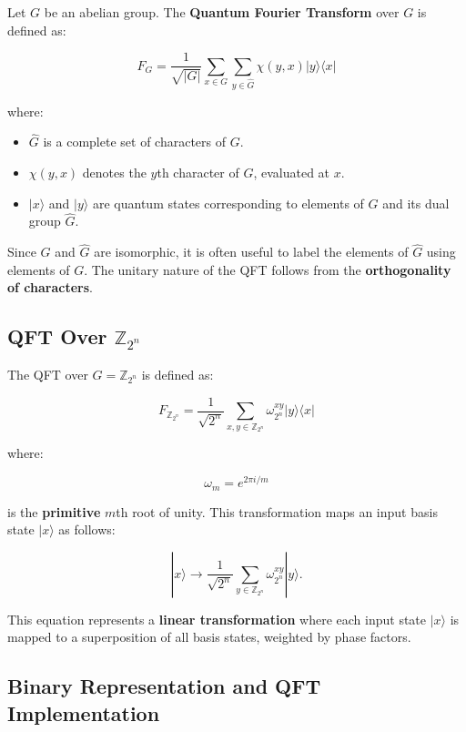 \documentclass[11pt]{article}
\theoremstyle{definition}
\begin{document}
Let \( G \) be an abelian group. The \textbf{Quantum Fourier Transform} over \( G \) is defined as:

\[
F_G = \frac{1}{\sqrt{|G|}} \sum_{x \in G} \sum_{y \in \hat{G}} \chi(y,x) | y \rangle \langle x |
\]

where:

\begin{itemize}
    \item \( \hat{G} \) is a complete set of characters of \( G \).
    \item \( \chi(y,x) \) denotes the \( y \)th character of \( G \), evaluated at \( x \).
    \item \( |x\rangle \) and \( |y\rangle \) are quantum states corresponding to elements of \( G \) and its dual group \( \hat{G} \).
\end{itemize}

Since \( G \) and \( \hat{G} \) are isomorphic, it is often useful to label the elements of \( \hat{G} \) using elements of \( G \). The unitary nature of the QFT follows from the \textbf{orthogonality of characters}.



\subsection{QFT Over \( \mathbb{Z}_{2^n} \)}

The QFT over \( G = \mathbb{Z}_{2^n} \) is defined as:

\[
F_{\mathbb{Z}_{2^n}} = \frac{1}{\sqrt{2^n}} \sum_{x,y \in \mathbb{Z}_{2^n}} \omega_{2^n}^{xy} | y \rangle \langle x |
\]

where:

\[
\omega_m = e^{2\pi i / m}
\]

is the \textbf{primitive} \( m \)th root of unity. This transformation maps an input basis state \( |x\rangle \) as follows:

\[
| x \rangle \to \frac{1}{\sqrt{2^n}} \sum_{y \in \mathbb{Z}_{2^n}} \omega_{2^n}^{xy} | y \rangle.
\]

This equation represents a \textbf{linear transformation} where each input state \( |x\rangle \) is mapped to a superposition of all basis states, weighted by phase factors.

\subsection{Binary Representation and QFT Implementation}
\end{document}
